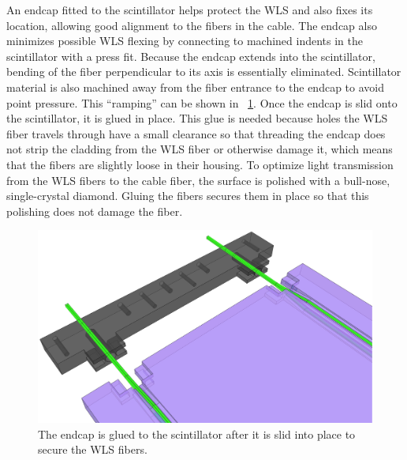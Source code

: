An endcap fitted to the scintillator helps protect the WLS and also fixes its location, allowing good alignment to the fibers in the cable.  The endcap also minimizes possible WLS flexing by connecting to machined indents in the scintillator with a press fit.  Because the endcap extends into the scintillator, bending of the fiber perpendicular to its axis is essentially eliminated.  Scintillator material is also machined away from the fiber entrance to the endcap to avoid point pressure.  This ``ramping'' can be shown in {\fig}~\ref{fig:paddleAssembly}.  Once the endcap is slid onto the scintillator, it is glued in place.  This glue is needed because holes the WLS fiber travels through have a small clearance so that threading the endcap does not strip the cladding from the WLS fiber or otherwise damage it, which means that the fibers are slightly loose in their housing.  To optimize light transmission from the WLS fibers to the cable fiber, the surface is polished with a bull-nose, single-crystal diamond.  Gluing the fibers secures them in place so that this polishing does not damage the fiber.  
\begin{figure}[htp]
\centering
\includegraphics[width=1.0\textwidth]{figures/veto_assembly.eps}
\caption{The endcap is glued to the scintillator after it is slid into place to secure the WLS fibers.}
\label{fig:paddleAssembly}
\end{figure}

